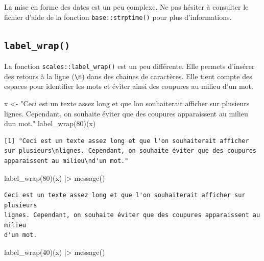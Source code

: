 \documentclass[
  letterpaper,
  DIV=11,
  numbers=noendperiod,
  oneside]{scrreprt}
\newenvironment{Shaded}{\begin{snugshade}}{\end{snugshade}}
\newcommand{\DecValTok}[1]{\textcolor[rgb]{0.68,0.00,0.00}{#1}}
\newcommand{\FunctionTok}[1]{\textcolor[rgb]{0.28,0.35,0.67}{#1}}
\newcommand{\NormalTok}[1]{\textcolor[rgb]{0.00,0.23,0.31}{#1}}
\newcommand{\OtherTok}[1]{\textcolor[rgb]{0.00,0.23,0.31}{#1}}
\newcommand{\SpecialCharTok}[1]{\textcolor[rgb]{0.37,0.37,0.37}{#1}}
\newcommand{\StringTok}[1]{\textcolor[rgb]{0.13,0.47,0.30}{#1}}
\begin{document}
La mise en forme des dates est un peu complexe. Ne pas hésiter à
consulter le fichier d'aide de la fonction \texttt{base::strptime()}
pour plus d'informations.

\hypertarget{label_wrap}{%
\subsection{\texorpdfstring{\texttt{label\_wrap()}}{label\_wrap()}}\label{label_wrap}}

La fonction \texttt{scales::label\_wrap()} est un peu différente. Elle
permets d'insérer des retours à la ligne (\texttt{\textbackslash{}n})
dans des chaines de caractères. Elle tient compte des espaces pour
identifier les mots et éviter ainsi des coupures au milieu d'un mot.

\begin{Shaded}
\begin{Highlighting}[]
\NormalTok{x }\OtherTok{\textless{}{-}} \StringTok{"Ceci est un texte assez long et que l\textquotesingle{}on souhaiterait afficher sur plusieurs lignes. Cependant, on souhaite éviter que des coupures apparaissent au milieu d\textquotesingle{}un mot."}
\FunctionTok{label\_wrap}\NormalTok{(}\DecValTok{80}\NormalTok{)(x)}
\end{Highlighting}
\end{Shaded}

\begin{verbatim}
[1] "Ceci est un texte assez long et que l'on souhaiterait afficher sur plusieurs\nlignes. Cependant, on souhaite éviter que des coupures apparaissent au milieu\nd'un mot."
\end{verbatim}

\begin{Shaded}
\begin{Highlighting}[]
\FunctionTok{label\_wrap}\NormalTok{(}\DecValTok{80}\NormalTok{)(x) }\SpecialCharTok{|\textgreater{}} \FunctionTok{message}\NormalTok{()}
\end{Highlighting}
\end{Shaded}

\begin{verbatim}
Ceci est un texte assez long et que l'on souhaiterait afficher sur plusieurs
lignes. Cependant, on souhaite éviter que des coupures apparaissent au milieu
d'un mot.
\end{verbatim}

\begin{Shaded}
\begin{Highlighting}[]
\FunctionTok{label\_wrap}\NormalTok{(}\DecValTok{40}\NormalTok{)(x) }\SpecialCharTok{|\textgreater{}} \FunctionTok{message}\NormalTok{()}
\end{Highlighting}
\end{Shaded}
\end{document}
